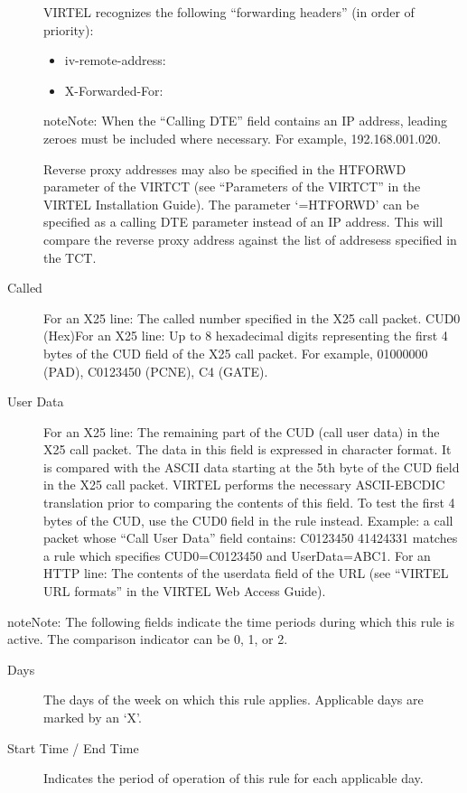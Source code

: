 \documentclass[letterpaper,10pt,english]{sphinxmanual}
\begin{document}
\begin{description}
VIRTEL recognizes the following “forwarding headers” (in order of priority):
\begin{itemize}
\item {} 
iv-remote-address:

\item {} 
X-Forwarded-For:

\end{itemize}

\begin{sphinxadmonition}{note}{Note:}
When the “Calling DTE” field contains an IP address, leading zeroes must be included where necessary. For example, 192.168.001.020.
\end{sphinxadmonition}

Reverse proxy addresses may also be specified in the HTFORWD parameter of the VIRTCT (see “Parameters of the VIRTCT” in the VIRTEL Installation Guide). The parameter ‘=HTFORWD’ can be specified as a calling DTE parameter instead of an IP address. This will compare the reverse proxy address against the list of addresess specified in the TCT.

\item[{Called}] \leavevmode
For an X25 line: The called number specified in the X25 call packet. CUD0 (Hex)For an X25 line: Up to 8 hexadecimal digits representing the first 4 bytes of the CUD field of the X25 call packet. For example, 01000000 (PAD), C0123450 (PCNE), C4 (GATE).

\item[{User Data}] \leavevmode
For an X25 line: The remaining part of the CUD (call user data) in the X25 call packet. The data in this field is expressed in character format. It is compared with the ASCII data starting at the 5th byte of the CUD field in the X25 call packet. VIRTEL performs the necessary ASCII-EBCDIC translation prior to comparing the contents of this field. To test the first 4 bytes of the CUD, use the CUD0 field in the rule instead. Example: a call packet whose “Call User Data” field contains: C0123450 41424331 matches a rule which specifies CUD0=C0123450 and UserData=ABC1. For an HTTP line: The contents of the userdata field of the URL (see “VIRTEL URL formats” in the VIRTEL Web Access Guide).

\end{description}

\begin{sphinxadmonition}{note}{Note:}
The following fields indicate the time periods during which this rule is active. The comparison indicator can be 0, 1, or 2.
\end{sphinxadmonition}
\begin{description}
\item[{Days}] \leavevmode
The days of the week on which this rule applies. Applicable days are marked by an ‘X’.

\item[{Start Time / End Time}] \leavevmode
Indicates the period of operation of this rule for each applicable day.

\end{description}
\end{document}
